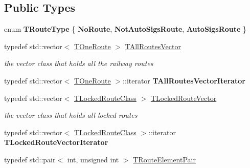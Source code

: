 \subsection*{Public Types}
\begin{DoxyCompactItemize}
\item 
\mbox{\label{class_t_all_routes_af94f31040cc7692c777123c609d4cbd6}} 
enum {\bfseries T\+Route\+Type} \{ {\bfseries No\+Route}, 
{\bfseries Not\+Auto\+Sigs\+Route}, 
{\bfseries Auto\+Sigs\+Route}
 \}
\item 
\mbox{\label{class_t_all_routes_a34636f74b522ec911900fce48ea6667c}} 
typedef std\+::vector$<$ \mbox{\hyperlink{class_t_one_route}{T\+One\+Route}} $>$ \mbox{\hyperlink{class_t_all_routes_a34636f74b522ec911900fce48ea6667c}{T\+All\+Routes\+Vector}}
\begin{DoxyCompactList}\small\item\em the vector class that holds all the railway routes \end{DoxyCompactList}\item 
\mbox{\label{class_t_all_routes_a863ba954ac5b7e2197ae1074cc7e268b}} 
typedef std\+::vector$<$ \mbox{\hyperlink{class_t_one_route}{T\+One\+Route}} $>$\+::iterator {\bfseries T\+All\+Routes\+Vector\+Iterator}
\item 
\mbox{\label{class_t_all_routes_a00c2d57382ed6560f1c611bdfddc3a6f}} 
typedef std\+::vector$<$ \mbox{\hyperlink{class_t_all_routes_1_1_t_locked_route_class}{T\+Locked\+Route\+Class}} $>$ \mbox{\hyperlink{class_t_all_routes_a00c2d57382ed6560f1c611bdfddc3a6f}{T\+Locked\+Route\+Vector}}
\begin{DoxyCompactList}\small\item\em the vector class that holds all locked routes \end{DoxyCompactList}\item 
\mbox{\label{class_t_all_routes_ac58b6335a806c347545f73f680b45afa}} 
typedef std\+::vector$<$ \mbox{\hyperlink{class_t_all_routes_1_1_t_locked_route_class}{T\+Locked\+Route\+Class}} $>$\+::iterator {\bfseries T\+Locked\+Route\+Vector\+Iterator}
\item 
typedef std\+::pair$<$ int, unsigned int $>$ \mbox{\hyperlink{class_t_all_routes_a159a7d547e3d435d109a36cb41193a78}{T\+Route\+Element\+Pair}}

\end{DoxyCompactItemize}
